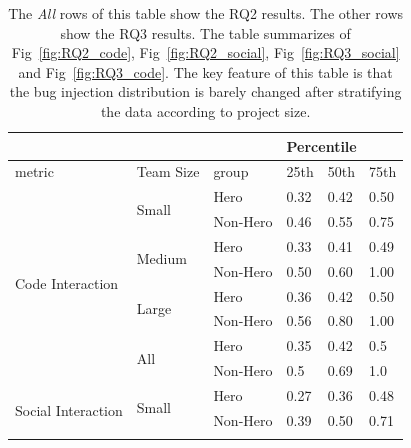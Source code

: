 \documentclass[sigconf,review]{acmart}
\begin{document}
\begin{table}[!t]
\caption{The {\em All} rows of this table
show the RQ2 results.
The other rows show the RQ3 results.
The table summarizes of Fig~\ref{fig:RQ2_code}, Fig~\ref{fig:RQ2_social}, Fig~\ref{fig:RQ3_social} and Fig~\ref{fig:RQ3_code}.
The key feature of this table is that the bug injection distribution is barely changed after stratifying the data according to project size.}\label{tbl:team_size}
{\scriptsize
\begin{center}

\begin{tabular}{|l|l|l|l|l|l|}
\hline
\multicolumn{3}{|l|}{}                                                   & \multicolumn{3}{l|}{Percentile} \\ \hline
metric                              & Team Size               & group    & 25th        & 50th       & 75th       \\ \hline
\multirow{8}{*}{Code Interaction}   & \multirow{2}{*}{Small}  & Hero     & 0.32      & 0.42     & 0.50     \\ \cline{3-6} 
                                    &                         & Non-Hero & 0.46      & 0.55     & 0.75     \\ \cline{2-6} 
                                    & \multirow{2}{*}{Medium} & Hero     & 0.33      & 0.41     & 0.49     \\ \cline{3-6} 
                                    &                         & Non-Hero & 0.50      & 0.60     & 1.00     \\ \cline{2-6} 
                                    & \multirow{2}{*}{Large}  & Hero     & 0.36      & 0.42     & 0.50     \\ \cline{3-6} 
                                    &                         & Non-Hero & 0.56      & 0.80     & 1.00     \\ \cline{2-6} 
                                    & \multirow{2}{*}{All}    & Hero     & 0.35      & 0.42     & 0.5      \\ \cline{3-6} 
                                    &                         & Non-Hero & 0.5       & 0.69     & 1.0      \\ \hline
\multirow{8}{*}{Social Interaction} & \multirow{2}{*}{Small}  & Hero     & 0.27      & 0.36     & 0.48     \\ \cline{3-6} 
                                    &                         & Non-Hero & 0.39      & 0.50     & 0.71     \\ \cline{2-6} 

\end{tabular}
\end{center}}
\end{table}
\end{document}
